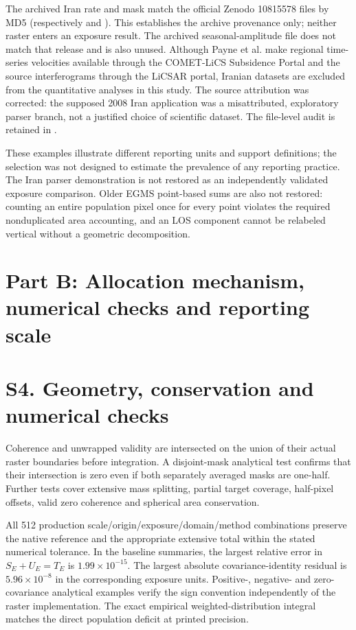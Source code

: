 \documentclass[10pt,a4paper]{article}
\begin{document}
The archived Iran rate and mask match the official Zenodo 10815578 files by MD5 (respectively  and ). This establishes the archive provenance only; neither raster enters an exposure result. The archived seasonal-amplitude file does not match that release and is also unused. Although Payne et al. make regional time-series velocities available through the COMET-LiCS Subsidence Portal and the source interferograms through the LiCSAR portal, Iranian datasets are excluded from the quantitative analyses in this study. The source attribution was corrected: the supposed 2008 Iran application was a misattributed, exploratory parser branch, not a justified choice of scientific dataset. The file-level audit is retained in .

These examples illustrate different reporting units and support definitions; the selection was not designed to estimate the prevalence of any reporting practice. The Iran parser demonstration is not restored as an independently validated exposure comparison. Older EGMS point-based sums are also not restored: counting an entire population pixel once for every point violates the required nonduplicated area accounting, and an LOS component cannot be relabeled vertical without a geometric decomposition.




\section*{Part B: Allocation mechanism, numerical checks and reporting scale}
\section*{S4. Geometry, conservation and numerical checks}
Coherence and unwrapped validity are intersected on the union of their actual raster boundaries before integration. A disjoint-mask analytical test confirms that their intersection is zero even if both separately averaged masks are one-half. Further tests cover extensive mass splitting, partial target coverage, half-pixel offsets, valid zero coherence and spherical area conservation.

All 512 production scale/origin/exposure/domain/method combinations preserve the native reference and the appropriate extensive total within the stated numerical tolerance. In the baseline summaries, the largest relative error in $S_E+U_E=T_E$ is $1.99\times10^{-15}$. The largest absolute covariance-identity residual is $5.96\times10^{-8}$ in the corresponding exposure units. Positive-, negative- and zero-covariance analytical examples verify the sign convention independently of the raster implementation. The exact empirical weighted-distribution integral matches the direct population deficit at printed precision.
\end{document}
